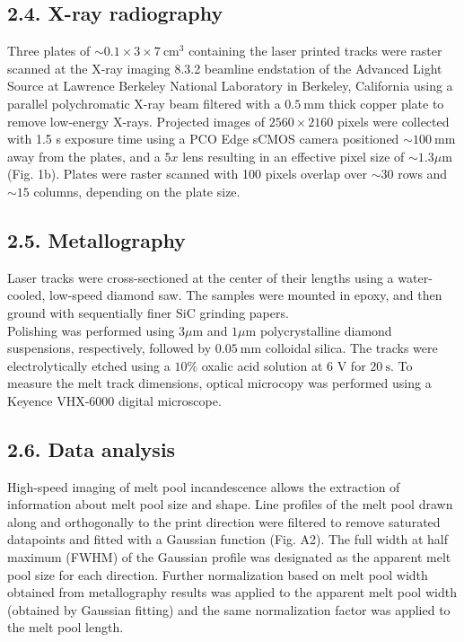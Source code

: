 \documentclass[10pt]{article}
\begin{document}
\subsection*{2.4. X-ray radiography}
Three plates of $\sim 0.1 \times 3 \times 7 \mathrm{~cm}^{3}$ containing the laser printed tracks were raster scanned at the X-ray imaging 8.3.2 beamline endstation of the Advanced Light Source at Lawrence Berkeley National Laboratory in Berkeley, California using a parallel polychromatic X-ray beam filtered with a $0.5 \mathrm{~mm}$ thick copper plate to remove low-energy $\mathrm{X}$-rays. Projected images of $2560 \times 2160$ pixels were collected with 1.5 s exposure time using a PCO Edge sCMOS camera positioned $\sim 100 \mathrm{~mm}$ away from the plates, and a $5 x$ lens resulting in an effective pixel size of $\sim 1.3 \mu \mathrm{m}$ (Fig. 1b). Plates were raster scanned with 100 pixels overlap over $\sim 30$ rows and $\sim 15$ columns, depending on the plate size.

\subsection*{2.5. Metallography}
Laser tracks were cross-sectioned at the center of their lengths using a water-cooled, low-speed diamond saw. The samples were mounted in epoxy, and then ground with sequentially finer $\mathrm{SiC}$ grinding papers.\\
Polishing was performed using $3 \mu \mathrm{m}$ and $1 \mu \mathrm{m}$ polycrystalline diamond suspensions, respectively, followed by $0.05 \mathrm{~mm}$ colloidal silica. The tracks were electrolytically etched using a $10 \%$ oxalic acid solution at 6 $\mathrm{V}$ for $20 \mathrm{~s}$. To measure the melt track dimensions, optical microcopy was performed using a Keyence VHX-6000 digital microscope.

\subsection*{2.6. Data analysis}
High-speed imaging of melt pool incandescence allows the extraction of information about melt pool size and shape. Line profiles of the melt pool drawn along and orthogonally to the print direction were filtered to remove saturated datapoints and fitted with a Gaussian function (Fig. A2). The full width at half maximum (FWHM) of the Gaussian profile was designated as the apparent melt pool size for each direction. Further normalization based on melt pool width obtained from metallography results was applied to the apparent melt pool width (obtained by Gaussian fitting) and the same normalization factor was applied to the melt pool length.
\end{document}
